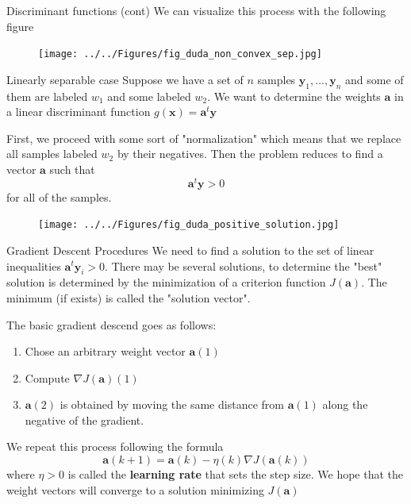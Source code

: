 \documentclass{beamer}
\begin{document}
\begin{frame}{Discriminant functions (cont)}
	We can visualize this process with the following figure
	\begin{figure}
		\centering
		\texttt{[image: ../../Figures/fig\_duda\_non\_convex\_sep.jpg]}
	\end{figure}
\end{frame}
\begin{frame}{Linearly separable case }
	Suppose we have a set of $n$ samples $\mathbf{y}_1,\ldots,\mathbf{y}_n$ and some of them are labeled $w_1$ and some labeled $w_2$. We want to determine the weights $\mathbf{a}$ in a linear discriminant function $g(\mathbf{x})=\mathbf{a}^t \mathbf{y}$
	
	First, we proceed with some sort of "normalization" which means that we replace all samples labeled $w_2$ by their negatives. Then the problem reduces to find a vector $\mathbf{a}$ such that 
	\begin{equation*}
		\mathbf{a}^t \mathbf y > 0
	\end{equation*}
for all of the samples. 

\begin{figure}
	\centering
	\texttt{[image: ../../Figures/fig\_duda\_positive\_solution.jpg]}
\end{figure}
\end{frame}

\begin{frame}{Gradient Descent Procedures}
		We need to find a solution to the set of linear inequalities $\mathbf{a}^t\mathbf{y}_i >0$. There may be several solutions, to determine the "best" solution is determined by the minimization of a criterion function $J(\mathbf{a})$.  The minimum (if exists) is called the "solution vector".
	
	The basic gradient descend goes as follows:
	
	\begin{enumerate}
		\item Chose an arbitrary weight vector $\mathbf{a}(1)$ 
		\item Compute $\nabla J (\mathbf{a})(1)$
		\item $\mathbf{a}(2)$ is obtained by moving the same distance from $\mathbf{a}(1)$ along the negative of the gradient.
	\end{enumerate}
We repeat this process following the formula
\begin{equation*}
	\mathbf{a}(k+1)= \mathbf{a}(k) -\eta(k) \nabla J (\mathbf{a}(k))
\end{equation*}
where $\eta >0 $ is called the {\bf learning rate } that sets the step size. We hope that the weight vectors will converge to a solution minimizing $J(\mathbf{a})$
\end{frame}
\end{document}
